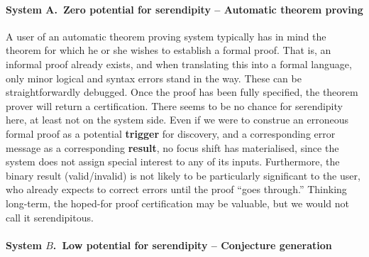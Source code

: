 \paragraph{System A.~Zero potential for serendipity -- Automatic theorem proving} 
A user of an automatic theorem proving system typically has in mind
the theorem for which he or she wishes to establish a formal proof.
That is, an informal proof already exists, and when translating this
into a formal language, only minor logical and syntax errors stand in
the way.  These can be straightforwardly debugged.  Once the proof has
been fully specified, the theorem prover will return a certification.
There seems to be no chance for serendipity here, at least not on the
system side.  Even if we were to construe an erroneous formal proof as
a potential \textbf{trigger} for discovery, and a corresponding error
message as a corresponding \textbf{result}, no focus shift has
materialised, since the system does not assign special interest to any
of its inputs.  Furthermore, the binary result (valid/invalid) is not
likely to be particularly significant to the user, who already expects
to correct errors until the proof ``goes through.''  Thinking
long-term, the hoped-for proof certification may be valuable, but we
would not call it serendipitous.


\paragraph{System $B$.~Low potential for serendipity -- Conjecture generation}

